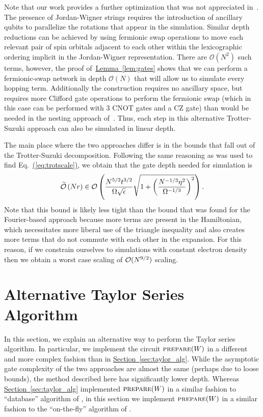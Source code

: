 \documentclass[superscriptaddress,aps,pra,nofootinbib,notitlepage,10pt,longbibliography]{revtex4-1}
\newcommand{\eq}[1]{Eq.~\hyperref[eq:#1]{(\ref*{eq:#1})}}
\renewcommand{\sec}[1]{\hyperref[sec:#1]{Section~\ref*{sec:#1}}}
\newcommand{\lem}[1]{\hyperref[lem:#1]{Lemma~\ref*{lem:#1}}}
\begin{document}
Note that our work provides a further optimization that was not appreciated in~\cite{Wecker2015a}. The presence of Jordan-Wigner strings requires the introduction of ancillary qubits to parallelize the rotations that appear in the simulation. Similar depth reductions can be achieved by using fermionic swap operations to move each relevant pair of spin orbitals adjacent to each other within the lexicographic ordering implicit in the Jordan-Wigner representation. There are $\mathcal{O}(N^2)$ such terms, however, the proof of~\lem{gates} shows that we can perform a fermionic-swap network in depth $\mathcal{O}(N)$ that will allow us to simulate every hopping term.  Additionally the construction requires no ancillary space, but requires more Clifford gate operations to perform the fermionic swap (which in this case can be performed with 3 CNOT gates and a CZ gate) than would be needed in the nesting approach of~\cite{Wecker2015a}.  Thus, each step in this alternative Trotter-Suzuki approach can also be simulated in linear depth.

The main place where the two approaches differ is in the bounds that fall out of the Trotter-Suzuki decomposition.  Following the same reasoning as was used to find \eq{trotscale}, we obtain that the gate depth needed for simulation is
\begin{equation}
\widetilde{\mathcal{O}}\left(Nr\right) \in {\cal O}\left(\frac{N^{5/2}t^{3/2}}{\Omega\sqrt{\epsilon}}\sqrt{1 +\left(\frac{N^{-1/3}\eta^2}{\Omega^{-1/3}} \right)^2 } \right).
\end{equation}
Note that this bound is likely less tight than the bound that was found for the Fourier-based approach because more terms are present in the Hamiltonian, which necessitates more liberal use of the triangle inequality and also creates more terms that do not commute with each other in the expansion.  For this reason, if we constrain ourselves to simulations with constant electron density then we obtain a worst case scaling of ${\cal O}(N^{9/2})$ scaling.


\section{Alternative Taylor Series Algorithm}
\label{app:onthefly}

In this section, we explain an alternative way to perform the Taylor series algorithm. In particular, we implement the circuit $\textsc{prepare}(W)$ in a different and more complex fashion than in \sec{taylor_alg}. While the asymptotic gate complexity of the two approaches are almost the same (perhaps due to loose bounds), the method described here has significantly lower depth. Whereas \sec{taylor_alg} implemented $\textsc{prepare}(W)$ in a similar fashion to ``database'' algorithm of \cite{BabbushSparse1}, in this section we implement $\textsc{prepare}(W)$ in a similar fashion to the ``on-the-fly'' algorithm of \cite{BabbushSparse1}.
\end{document}
